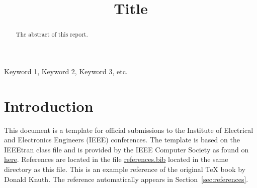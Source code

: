\documentclass[conference, 10pt]{IEEEtran}
\begin{document}
\title{Title}

\author{
  \and
  \and
}

\maketitle

\begin{abstract}
  The abstract of this report.
\end{abstract}

\begin{IEEEkeywords}
Keyword 1, Keyword 2, Keyword 3, etc.
\end{IEEEkeywords}

\section{Introduction} 

This document is a template for official submissions to the Institute of
Electrical and Electronics Engineers (IEEE) conferences. The template is based
on the IEEEtran class file and is provided by the IEEE Computer Society as found
on \href{https://www.ieee.org/conferences/publishing/templates.html}{here}.
References are located in the file \href{references.bib}{references.bib} located
in the same directory as this file. This is an example reference of the original
\TeX{} book by Donald Knuth\cite{texbook}. The reference automatically appears
in Section~\ref{sec:references}.


\label{sec:references}

\end{document}
